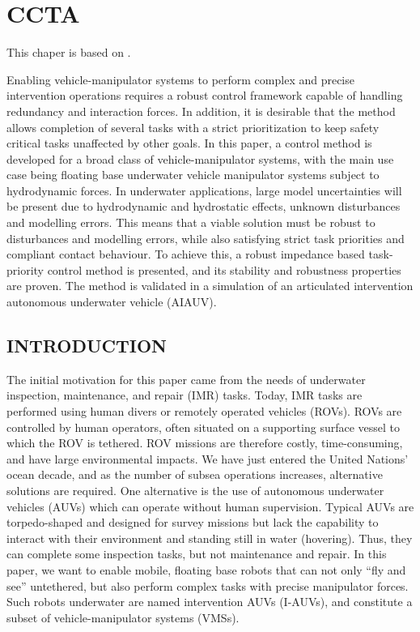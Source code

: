 \documentclass[../main.tex]{subfiles}
\begin{document}
\chapter{CCTA}

This chaper is based on \cite{saebo2022}.

Enabling vehicle-manipulator systems to perform complex and precise intervention operations requires a robust control framework capable of handling redundancy and interaction forces. In addition, it is desirable that the method allows completion of several tasks with a strict prioritization to keep safety critical tasks unaffected by other goals. In this paper, a control method is developed for a broad class of vehicle-manipulator systems, with the main use case being floating base underwater vehicle manipulator systems subject to hydrodynamic forces. In underwater applications, large model uncertainties will be present due to hydrodynamic and hydrostatic effects, unknown disturbances and modelling errors. This means that a viable solution must be robust to disturbances and modelling errors, while also satisfying strict task priorities and compliant contact behaviour. To achieve this, a robust impedance based task-priority control method is presented, and its stability and robustness properties are proven. The method is validated in a simulation of an articulated intervention autonomous underwater vehicle (AIAUV).

\section{INTRODUCTION}
\label{introduction}
%

The initial motivation for this paper came from the needs of underwater inspection, maintenance, and repair (IMR) tasks. Today, IMR tasks are performed using human divers or remotely operated vehicles (ROVs). ROVs are controlled by human operators, often situated on a supporting surface vessel to which the ROV is tethered. ROV missions are therefore costly, time-consuming, and have large environmental impacts. We have just entered the United Nations' ocean decade, and as the number of subsea operations increases, alternative solutions are required. One alternative is the use of autonomous underwater vehicles (AUVs) which can operate without human supervision. Typical AUVs are torpedo-shaped and designed for survey missions but lack the capability to interact with their environment and standing still in water (hovering). Thus, they can complete some inspection tasks, but not maintenance and repair. In this paper, we want to enable mobile, floating base robots that can not only “fly and see” untethered, but also perform complex tasks with precise manipulator forces. Such robots underwater are named intervention AUVs (I-AUVs), and constitute a subset of vehicle-manipulator systems (VMSs).
\end{document}
